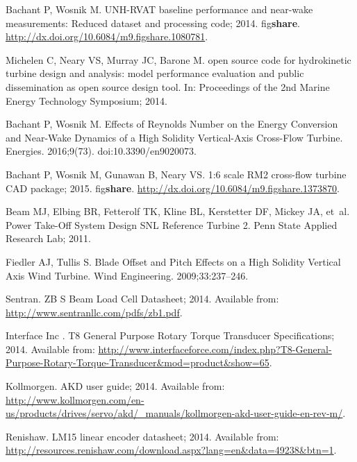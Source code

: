\documentclass[10pt,letterpaper]{article}
\begin{document}
\begin{thebibliography}{10}
    Bachant P, Wosnik M. {UNH-RVAT} baseline performance and near-wake
      measurements: Reduced dataset and processing code; 2014.
    \newblock fig\textbf{share}.
    \newblock
      \url{http://dx.doi.org/10.6084/m9.figshare.1080781}.

    Michelen C, Neary VS, Murray JC, Barone M.
     open source code for hydrokinetic turbine design and
      analysis: model performance evaluation and public dissemination as open
      source design tool.
    \newblock In: Proceedings of the 2nd Marine Energy Technology Symposium; 2014.

    Bachant P, Wosnik M.
    \newblock Effects of Reynolds Number on the Energy Conversion and Near-Wake
      Dynamics of a High Solidity Vertical-Axis Cross-Flow Turbine.
    \newblock Energies. 2016;9(73).
    \newblock doi:{10.3390/en9020073}.

    Bachant P, Wosnik M, Gunawan B, Neary VS. 1:6 scale {RM2} cross-flow turbine
      {CAD} package; 2015.
    \newblock fig\textbf{share}.
      \url{http://dx.doi.org/10.6084/m9.figshare.1373870}.

    Beam MJ, Elbing BR, Fetterolf TK, Kline BL, Kerstetter DF, Mickey JA, et~al.
    \newblock Power Take-Off System Design {SNL} Reference Turbine 2.
    \newblock Penn State Applied Research Lab; 2011.

    Fiedler AJ, Tullis S.
    \newblock Blade Offset and Pitch Effects on a High Solidity Vertical Axis Wind
      Turbine.
    \newblock Wind Engineering. 2009;33:237--246.

    Sentran. {ZB} {S} Beam Load Cell Datasheet; 2014.
    \newblock Available from: \url{http://www.sentranllc.com/pdfs/zb1.pdf}.

    {Interface Inc }. T8 General Purpose Rotary Torque Transducer Specifications;
      2014.
    \newblock Available from:
      \url{http://www.interfaceforce.com/index.php?T8-General-Purpose-Rotary-Torque-Transducer&mod=product&show=65}.

    Kollmorgen. {AKD} user guide; 2014.
    \newblock Available from:
      \url{http://www.kollmorgen.com/en-us/products/drives/servo/akd/_manuals/kollmorgen-akd-user-guide-en-rev-m/}.

    Renishaw. {LM}15 linear encoder datasheet; 2014.
    \newblock Available from:
      \url{http://resources.renishaw.com/download.aspx?lang=en&data=49238&btn=1}.


\end{thebibliography}
\end{document}
